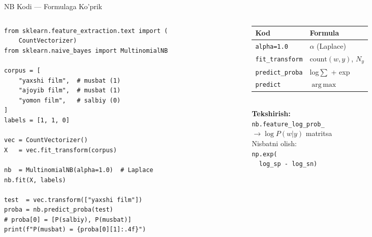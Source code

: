 \documentclass[aspectratio=169,11pt]{beamer}
\begin{document}
\begin{frame}[fragile]{NB Kodi --- Formulaga Ko'prik}
  \begin{columns}[T]
    \begin{column}{0.57\textwidth}
\begin{lstlisting}
from sklearn.feature_extraction.text import (
    CountVectorizer)
from sklearn.naive_bayes import MultinomialNB

corpus = [
    "yaxshi film",  # musbat (1)
    "ajoyib film",  # musbat (1)
    "yomon film",   # salbiy (0)
]
labels = [1, 1, 0]

vec = CountVectorizer()
X   = vec.fit_transform(corpus)

nb  = MultinomialNB(alpha=1.0)  # Laplace
nb.fit(X, labels)

test  = vec.transform(["yaxshi film"])
proba = nb.predict_proba(test)
# proba[0] = [P(salbiy), P(musbat)]
print(f"P(musbat) = {proba[0][1]:.4f}")
\end{lstlisting}
    \end{column}
    \begin{column}{0.40\textwidth}
      \small
      \begin{tabular}{@{}ll@{}}
        \toprule
        Kod & Formula \\
        \midrule
        \texttt{alpha=1.0} & $\alpha$ (Laplace) \\
        \texttt{fit\_transform} & $\mathrm{count}(w,y)$, $N_y$ \\
        \texttt{predict\_proba} & log$\sum$ + exp \\
        \texttt{predict}        & $\operatorname{arg\,max}$ \\
        \bottomrule
      \end{tabular}
      \vspace{6pt}\\
      \small\textbf{Tekshirish:}\\
      \texttt{nb.feature\_log\_prob\_}\\
      $\to\log P(w|y)$ matritsa\\[4pt]
      \textcolor{halfgray}{\footnotesize
        Nisbatni olish:\\
        \texttt{np.exp(}\\
        \texttt{~~log\_sp - log\_sn)}}
    \end{column}
  \end{columns}
\end{frame}
\end{document}
